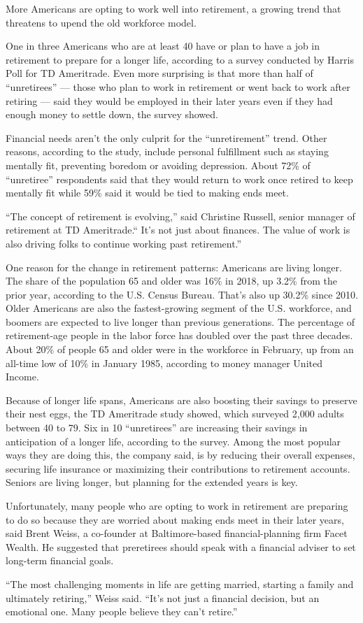 More Americans are opting to work well into retirement, a growing trend that threatens to upend the old workforce model.


One in three Americans who are at least 40 have or plan to have a job in retirement to prepare for a longer life, according to a survey conducted by Harris Poll for TD Ameritrade. Even more surprising is that more than half of ``unretirees'' — those who plan to work in retirement or went back to work after retiring — said they would be employed in their later years even if they had enough money to settle down, the survey showed.


Financial needs aren't the only culprit for the ``unretirement'' trend. Other reasons, according to the study, include personal fulfillment such as staying mentally fit, preventing boredom or avoiding depression. About 72\% of ``unretiree'' respondents said that they would return to work once retired to keep mentally fit while 59\% said it would be tied to making ends meet.


``The concept of retirement is evolving,'' said Christine Russell, senior manager of retirement at TD Ameritrade.`` It's not just about finances. The value of work is also driving folks to continue working past retirement.''


One reason for the change in retirement patterns: Americans are living longer. The share of the population 65 and older was 16\% in 2018, up 3.2\% from the prior year, according to the U.S. Census Bureau. That's also up 30.2\% since 2010. Older Americans are also the fastest-growing segment of the U.S. workforce, and boomers are expected to live longer than previous generations. The percentage of retirement-age people in the labor force has doubled over the past three decades. About 20\% of people 65 and older were in the workforce in February, up from an all-time low of 10\% in January 1985, according to money manager United Income.


Because of longer life spans, Americans are also boosting their savings to preserve their nest eggs, the TD Ameritrade study showed, which surveyed 2,000 adults between 40 to 79. Six in 10 ``unretirees'' are increasing their savings in anticipation of a longer life, according to the survey. Among the most popular ways they are doing this, the company said, is by reducing their overall expenses, securing life insurance or maximizing their contributions to retirement accounts. Seniors are living longer, but planning for the extended years is key.


Unfortunately, many people who are opting to work in retirement are preparing to do so because they are worried about making ends meet in their later years, said Brent Weiss, a co-founder at Baltimore-based financial-planning firm Facet Wealth. He suggested that preretirees should speak with a financial adviser to set long-term financial goals.


``The most challenging moments in life are getting married, starting a family and ultimately retiring,'' Weiss said. ``It's not just a financial decision, but an emotional one. Many people believe they can't retire.''